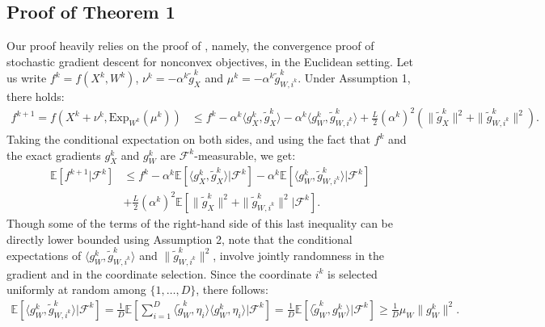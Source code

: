 \documentclass{article}
\def \E {\mathbb{E}}
\def \calF {\mathcal{F}}
\def \Exp {\mathrm{Exp}}
\begin{document}
\subsection{Proof of Theorem 1}
Our proof heavily relies on the proof of \cite[Theorem 4.10]{Bottou2018}, namely, the convergence proof of stochastic gradient descent for nonconvex objectives, in the Euclidean setting. Let us write $f^k = f(X^k, W^k)$, $\nu^k = - \alpha^k \tilde{g}_X^k$ and $\mu^k = - \alpha^k \tilde{g}_{W,i^k}^k$. Under Assumption 1, there holds:
\begin{equation*}
\begin{aligned}
    f^{k+1} = f(X^k+\nu^k,\Exp_{W^{k}}(\mu^k)) &\leq  f^k - \alpha^k \langle g_X^k, \tilde{g}_X^k  \rangle - \alpha^k \langle g_W^k, \tilde{g}_{W,i^k}^k  \rangle 
    + \frac{L}{2} (\alpha^k)^2 \left( \| \tilde{g}_X^k \|^2 + \| \tilde{g}_{W,i^k}^k \|^2 \right).
    \end{aligned}
\end{equation*}
Taking the conditional expectation on both sides, and using the fact that $f^k$ and the exact gradients $g_X^k$ and $g_W^k$ are $\calF^k$-measurable, we get:
\begin{equation*}
\begin{aligned}
    \E \left[ f^{k+1} | \calF^k \right] &\leq  f^k - \alpha^k \E \left[  \langle g_X^k, \tilde{g}_X^k  \rangle | \calF^k \right] - \alpha^k \E \left[ \langle g_W^k, \tilde{g}_{W,i^k}^k  \rangle | \calF^k \right]\\
    &+ \frac{L}{2} (\alpha^k)^2 \E \left[  \| \tilde{g}_X^k \|^2 + \| \tilde{g}_{W,i^k}^k \|^2 | \calF^k \right].
    \end{aligned}
\end{equation*}
Though some of the terms of the right-hand side of this last inequality can be directly lower bounded using Assumption 2, note that the conditional expectations of $\langle g_W^k, \tilde{g}_{W,i^k}^k  \rangle$ and $ \| \tilde{g}_{W,i^k}^k \|^2$, involve jointly randomness in the gradient and in the coordinate selection. Since the coordinate $i^k$ is selected uniformly at random among $\{1, \dots, D\}$, there follows:
\begin{equation*}
\begin{aligned}
    \E \left[ \langle g_W^k, \tilde{g}_{W,i^k}^k  \rangle  | \calF^k \right] 
    = \frac{1}{D}  \E \left[ \sum_{i = 1}^D \langle \tilde g_W^k, \eta_i \rangle \langle g_W^k, \eta_i  \rangle  | \calF^k \right] = \frac{1}{D}  \E \left[ \langle \tilde{g}_W^k, g_W^k \rangle  | \calF^k \right] \geq \frac{1}{D} \mu_W \|g_{W}^k \|^2.
    \end{aligned}
\end{equation*}
\end{document}
